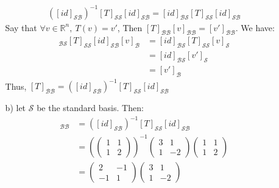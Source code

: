 \documentclass{article}
\begin{document}
\begin{itemize}
\begin{itemize}
        \begin{align*}
            \left([id]_{\mathcal{S} \mathcal{B} }\right)^{-1}[T]_{\mathcal{S}\mathcal{S}} [id]_{\mathcal{S} \mathcal{B}}= [id]_{\mathcal{B} \mathcal{S}}[T]_{\mathcal{S}\mathcal{S}} [id]_{\mathcal{S} \mathcal{B}}
        \end{align*}
        Say that \(\forall v \in \mathbb{R}^n,\ T(v)=v'\), Then \([T]_{\mathcal{B}\mathcal{B}}[v]_{\mathcal{B}\mathcal{B}} = [v']_{\mathcal{B}\mathcal{B}}\). We have:
        \begin{align*}
            [id]_{\mathcal{B} \mathcal{S}}[T]_{\mathcal{S}\mathcal{S}} [id]_{\mathcal{S} \mathcal{B}}[v]_{\mathcal{B}}
            &=[id]_{\mathcal{B} \mathcal{S}}[T]_{\mathcal{S}\mathcal{S}} [v]_{\mathcal{S}}\\
            &=[id]_{\mathcal{B} \mathcal{S}}[v']_{\mathcal{S}}\\
            &=[v']_{\mathcal{B}}
        \end{align*}
        Thus, \([T]_{\mathcal{B}\mathcal{B}} = \left([id]_{\mathcal{S} \mathcal{B} }\right)^{-1}[T]_{\mathcal{S}\mathcal{S}} [id]_{\mathcal{S} \mathcal{B}}\)
        \newpage
        \item [b)] let \(\mathcal{S}\) be the standard basis. Then:
        \begin{align*}
            [T]_{\mathcal{B}\mathcal{B}} &= \left([id]_{\mathcal{S} \mathcal{B} }\right)^{-1}[T]_{\mathcal{S}\mathcal{S}} [id]_{\mathcal{S} \mathcal{B}}\\
            &=\left(\begin{pmatrix}
                1&1\\
                1&2
            \end{pmatrix}\right)^{-1}
            \begin{pmatrix}
                3&1\\1&-2
            \end{pmatrix}
            \begin{pmatrix}
                1&1\\
                1&2
            \end{pmatrix}\\
            &=\begin{pmatrix}
                2&-1\\
                -1&1
            \end{pmatrix}
            \begin{pmatrix}
                3&1\\1&-2

\end{pmatrix}
\end{align*}
\end{itemize}
\end{itemize}
\end{document}
